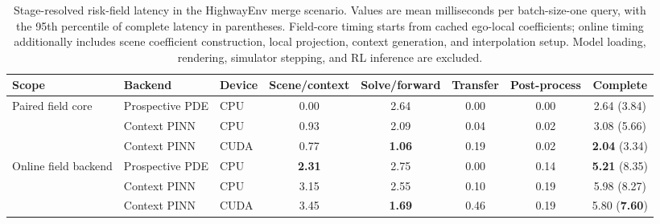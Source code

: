 \begin{table}[t]
\centering
\caption{Stage-resolved risk-field latency in the HighwayEnv merge scenario. Values are mean milliseconds per batch-size-one query, with the 95th percentile of complete latency in parentheses. Field-core timing starts from cached ego-local coefficients; online timing additionally includes scene coefficient construction, local projection, context generation, and interpolation setup. Model loading, rendering, simulator stepping, and RL inference are excluded.}
\label{tab:pinn_runtime_scope}
\setlength{\tabcolsep}{4.2pt}
\begin{tabular}{lllccccc}
\toprule
Scope & Backend & Device & Scene/context & Solve/forward & Transfer & Post-process & Complete \\
\midrule
\multirow{3}{*}{Paired field core}
 & Prospective PDE & CPU  & 0.00 & 2.64 & 0.00 & 0.00 & 2.64 (3.84) \\
 & Context PINN    & CPU  & 0.93 & 2.09 & 0.04 & 0.02 & 3.08 (5.66) \\
 & Context PINN    & CUDA & 0.77 & \textbf{1.06} & 0.19 & 0.02 & \textbf{2.04} (3.34) \\
\midrule
\multirow{3}{*}{Online field backend}
 & Prospective PDE & CPU  & \textbf{2.31} & 2.75 & 0.00 & 0.14 & \textbf{5.21} (8.35) \\
 & Context PINN    & CPU  & 3.15 & 2.55 & 0.10 & 0.19 & 5.98 (8.27) \\
 & Context PINN    & CUDA & 3.45 & \textbf{1.69} & 0.46 & 0.19 & 5.80 (\textbf{7.60}) \\
\bottomrule
\end{tabular}
\end{table}
